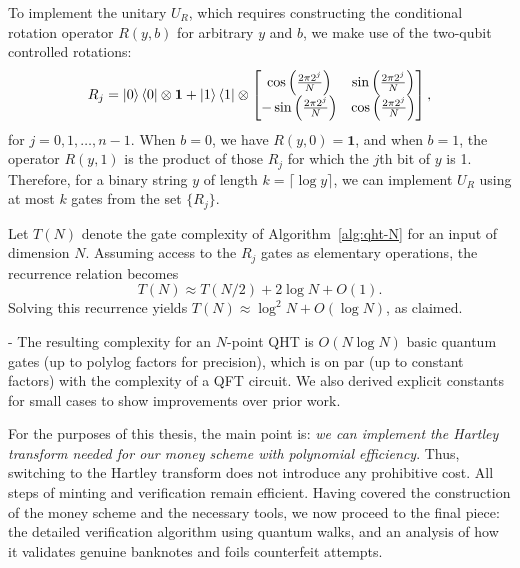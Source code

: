 \documentclass[12pt]{report}
\begin{document}
    To implement the unitary \( U_R \), which requires constructing the conditional rotation operator \( R(y, b) \) for arbitrary \( y \) and \( b \), we make use of the two-qubit controlled rotations:
    \[
    R_j = \ket{0}\bra{0} \otimes \mathbf{1} + \ket{1}\bra{1} \otimes
    \begin{bmatrix}
    \cos\left(\frac{2\pi 2^j}{N}\right) & \sin\left(\frac{2\pi 2^j}{N}\right) \\
    -\sin\left(\frac{2\pi 2^j}{N}\right) & \cos\left(\frac{2\pi 2^j}{N}\right)
    \end{bmatrix},
    \]
    for \( j = 0, 1, \dots, n - 1 \). When \( b = 0 \), we have \( R(y, 0) = \mathbf{1} \), and when \( b = 1 \), the operator \( R(y, 1) \) is the product of those \( R_j \) for which the \( j \)th bit of \( y \) is 1. Therefore, for a binary string \( y \) of length \( k = \lceil \log y \rceil \), we can implement \( U_R \) using at most \( k \) gates from the set \( \{R_j\} \).
    
    Let \( T(N) \) denote the gate complexity of Algorithm~\ref{alg:qht-N} for an input of dimension \( N \). Assuming access to the \( R_j \) gates as elementary operations, the recurrence relation becomes
    \[
    T(N) \approx T(N / 2) + 2\log N + O(1).
    \]
    Solving this recurrence yields \( T(N) \approx \log^2 N + O(\log N) \), as claimed.


- The resulting complexity for an $N$-point QHT is $O(N \log N)$ basic quantum gates (up to polylog factors for precision), which is on par (up to constant factors) with the complexity of a QFT circuit. We also derived explicit constants for small cases to show improvements over prior work.

For the purposes of this thesis, the main point is: \emph{we can implement the Hartley transform needed for our money scheme with polynomial efficiency}. Thus, switching to the Hartley transform does not introduce any prohibitive cost. All steps of minting and verification remain efficient. Having covered the construction of the money scheme and the necessary tools, we now proceed to the final piece: the detailed verification algorithm using quantum walks, and an analysis of how it validates genuine banknotes and foils counterfeit attempts.
\vspace{1em}
\end{document}
